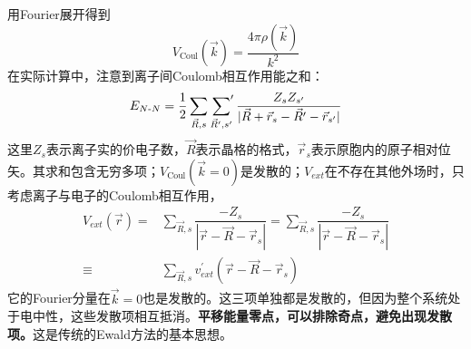用Fourier展开得到
\begin{equation}
  V_{\mathrm{Coul}}(\vec k)=\dfrac{4\pi\rho(\vec k)}{k^2}
  \label{eq:poisson-k}
\end{equation}
在实际计算中，注意到离子间\textrm{Coulomb}相互作用能之和：
$$E_{N\textrm{-}N}=\dfrac12\sum_{\vec R,s}\sideset{}{^\prime}\sum_{\vec R^\prime,s^\prime}\dfrac{Z_sZ_{s^\prime}}{|\vec R+\vec r_s-\vec R^\prime-\vec r_{s^\prime}|}$$
这里$Z_s$表示离子实的价电子数，$\vec R$表示晶格的格式，$\vec r_s$表示原胞内的原子相对位矢。其求和包含无穷多项；$V_{\mathrm{Coul}}(\vec k=0)$是发散的；$V_{ext}$在不存在其他外场时，只考虑离子与电子的\textrm{Coulomb}相互作用，
\begin{equation}
  \begin{split}
    V_{ext}(\vec r)=&\sum_{\vec R,s}\dfrac{-Z_s}{|\vec r-\vec R-\vec r_s|}=\sum_{\vec R,s}\dfrac{-Z_s}{|\vec r-\vec R-\vec r_s|} \\
    \equiv&\sum_{\vec R,s}v_{ext}^\prime(\vec r-\vec R-\vec r_s)
  \end{split}
  \label{eq:solid-52}
\end{equation}
它的\textrm{Fourier}分量在$\vec k=0$也是发散的。这三项单独都是发散的，但因为整个系统处于电中性，这些发散项相互抵消。\textbf{平移能量零点，可以排除奇点，避免出现发散项。}\cite{XIE-LU}这是传统的\textrm{Ewald}方法\cite{Born-Huang}的基本思想。

